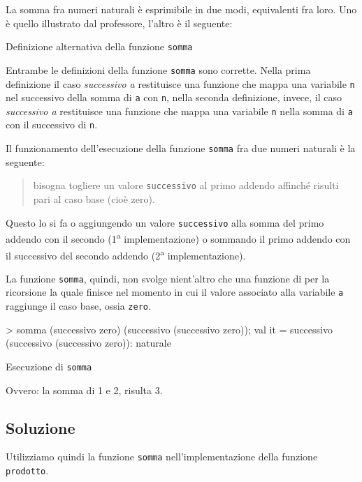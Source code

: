 La somma fra numeri naturali è esprimibile in due modi, equivalenti fra loro.
Uno è quello illustrato dal professore, l'altro è il seguente:

\begin{listing}[!h]
\caption[Funzione \texttt{somma} alternativa]{Definizione alternativa della funzione \texttt{somma}}
\end{listing}

Entrambe le definizioni della funzione \texttt{somma} sono corrette. Nella prima definizione il caso \emph{successivo a} restituisce una funzione che mappa una variabile \texttt{n} nel successivo della somma di \texttt{a} con \texttt{n}, nella seconda definizione, invece, il caso \emph{successivo a} restituisce una funzione che mappa una variabile \texttt{n} nella somma di \texttt{a} con il successivo di \texttt{n}.

\medskip
Il funzionamento dell'esecuzione della funzione \texttt{somma} fra due numeri naturali è la seguente:
\begin{quote}
bisogna togliere un valore \texttt{successivo} al primo addendo affinché risulti pari al caso base (cioè zero).
\end{quote}
Questo lo si fa o aggiungendo un valore \texttt{successivo} alla somma del primo addendo con il secondo (1\textsuperscript{a} implementazione) o sommando il primo addendo con il successivo del secondo addendo (2\textsuperscript{a} implementazione).

La funzione \texttt{somma}, quindi, non svolge nient'altro che una funzione di  per la ricorsione la quale finisce nel momento in cui il valore associato alla variabile \texttt{a} raggiunge il caso base, ossia \texttt{zero}.

\begin{listing}[!h]
\begin{smlcode}
> somma (successivo zero) (successivo (successivo zero));
val it = successivo (successivo (successivo zero)): naturale
\end{smlcode}
\caption[]{Esecuzione di \texttt{somma}}
\end{listing}

Ovvero: la somma di 1 e 2, risulta 3.

\subsection{Soluzione}

Utilizziamo quindi la funzione \texttt{somma} nell'implementazione della funzione \texttt{prodotto}.

